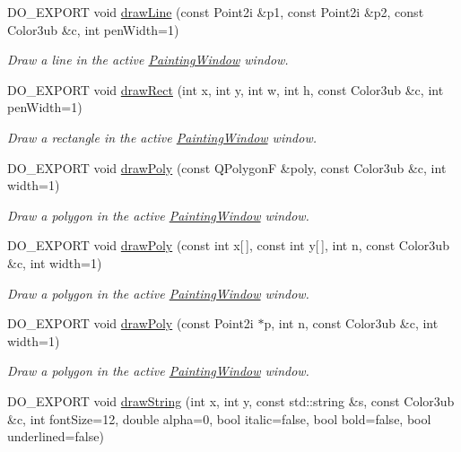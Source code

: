 \begin{DoxyCompactItemize}
D\-O\-\_\-\-E\-X\-P\-O\-R\-T void \hyperlink{group___draw2_d_ga949db317830adf652591ff57a1f23a4b}{draw\-Line} (const Point2i \&p1, const Point2i \&p2, const Color3ub \&c, int pen\-Width=1)
\begin{DoxyCompactList}\small\item\em Draw a line in the active \hyperlink{class_d_o_1_1_painting_window}{Painting\-Window} window. \end{DoxyCompactList}\item 
D\-O\-\_\-\-E\-X\-P\-O\-R\-T void \hyperlink{group___draw2_d_ga9b53d46ef158cd6e3cbe1bf7a7845b30}{draw\-Rect} (int x, int y, int w, int h, const Color3ub \&c, int pen\-Width=1)
\begin{DoxyCompactList}\small\item\em Draw a rectangle in the active \hyperlink{class_d_o_1_1_painting_window}{Painting\-Window} window. \end{DoxyCompactList}\item 
D\-O\-\_\-\-E\-X\-P\-O\-R\-T void \hyperlink{group___draw2_d_ga52558e3f2f1212919480f8bbae221782}{draw\-Poly} (const Q\-Polygon\-F \&poly, const Color3ub \&c, int width=1)
\begin{DoxyCompactList}\small\item\em Draw a polygon in the active \hyperlink{class_d_o_1_1_painting_window}{Painting\-Window} window. \end{DoxyCompactList}\item 
D\-O\-\_\-\-E\-X\-P\-O\-R\-T void \hyperlink{group___draw2_d_ga046ecaf871cc43b13a63fbe84a7074af}{draw\-Poly} (const int x\mbox{[}$\,$\mbox{]}, const int y\mbox{[}$\,$\mbox{]}, int n, const Color3ub \&c, int width=1)
\begin{DoxyCompactList}\small\item\em Draw a polygon in the active \hyperlink{class_d_o_1_1_painting_window}{Painting\-Window} window. \end{DoxyCompactList}\item 
D\-O\-\_\-\-E\-X\-P\-O\-R\-T void \hyperlink{group___draw2_d_gaf83f860ff583d8ea177703d589d43568}{draw\-Poly} (const Point2i $\ast$p, int n, const Color3ub \&c, int width=1)
\begin{DoxyCompactList}\small\item\em Draw a polygon in the active \hyperlink{class_d_o_1_1_painting_window}{Painting\-Window} window. \end{DoxyCompactList}\item 
D\-O\-\_\-\-E\-X\-P\-O\-R\-T void \hyperlink{group___draw2_d_gabc402ab820b0c16d0179e526de04949d}{draw\-String} (int x, int y, const std\-::string \&s, const Color3ub \&c, int font\-Size=12, double alpha=0, bool italic=false, bool bold=false, bool underlined=false)

\end{DoxyCompactItemize}

